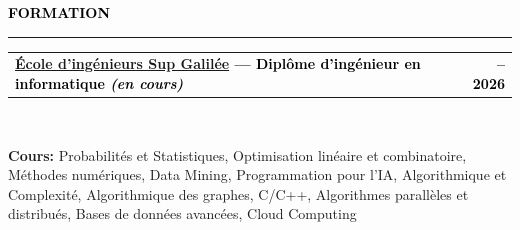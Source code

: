 \documentclass[10pt,english,french]{article}
\makeatletter
\newcommand{\educationIcon}[1][black]{\textcolor{#1}{\faGraduationCap}}
\newlength{\mpwidth}
\newcommand{\cvsection}[1]{
    \vspace{4pt}
    \textbf{\fontsize{9pt}{10pt}\selectfont \textcolor{black}{#1}}
    \vspace{6pt}
    \hrule
    \vspace{6pt}
}
\newcommand{\cvtextnotab}[1]{
    \parbox{1\mpwidth}{#1}
}
\newcommand{\cvevent}[2]{
    \vspace{2pt}
    \parbox{\mpwidth}{
        \begin{tabular*}{1\mpwidth}{@{\extracolsep{\fill}} l r}
            \textcolor{black}{\textbf{\fontsize{11}{12}\selectfont #1}} & \textcolor{black}{\textbf{\fontsize{12}{12}\selectfont #2}} \\
        \end{tabular*}\\[-8pt] %
    }
}
\newcommand{\cvsubevent}[2]{
    \parbox{\mpwidth}{
        \begin{tabular*}{1\mpwidth}{@{\extracolsep{\fill}} l r}
            \textcolor{black}{\textit{\fontsize{10}{12}\selectfont #1}} & \textcolor{black}{\textit{\fontsize{10}{12}\selectfont #2}} \\
        \end{tabular*}\\[-8pt] %
    }
    \vspace{-10pt}
}
\makeatother
\begin{document}

\vspace{-5pt}
\cvsection{\educationIcon[black]\hspace{4pt}FORMATION}

\vspace{-3pt}
\cvevent{\href{https://www.sup-galilee.univ-paris13.fr/}{École d'ingénieurs Sup Galilée} --- Diplôme d'ingénieur en informatique \textit{(en cours)}}{\fontsize{11pt}{11pt}\selectfont 2023\hspace{5pt}--\hspace{5pt}2026}

\vspace{-3pt}
\cvtextnotab{
    \textbf{Cours\!:}
    Probabilités et Statistiques, Optimisation linéaire et combinatoire,
    Méthodes numériques, Data Mining, Programmation pour l'IA,
    Algorithmique et Complexité, Algorithmique des graphes,
    C/C++, Algorithmes parallèles et distribués,
    Bases de données avancées, Cloud Computing
}



\end{document}
